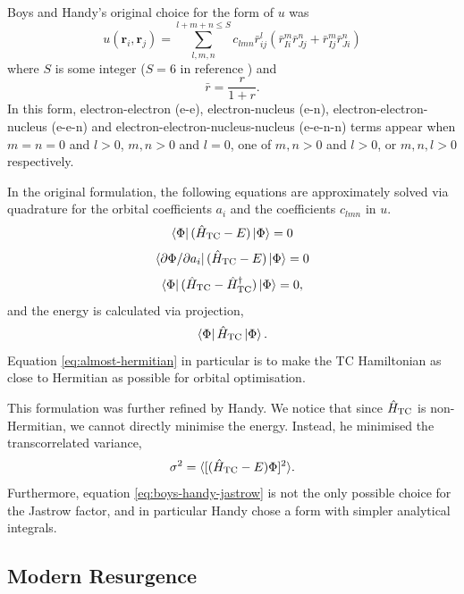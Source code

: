 Boys and Handy's original choice for the form of $u$ was
\begin{equation}
    \label{eq:boys-handy-jastrow}
    u(\bm r_i, \bm r_j) = \sum_{l,m,n}^{l+m+n\leq S} c_{lmn}\bar r_{ij}^l(\bar r_{Ii}^m\bar r_{Jj}^n + \bar r_{Ij}^m\bar r_{Ji}^n)
\end{equation}
where $S$ is some integer ($S=6$ in reference )\supercite{cohenSimilarity2019} and
\begin{equation}
    \bar r = \frac{r}{1+r}.
\end{equation}
In this form, electron-electron (e-e), electron-nucleus (e-n), electron-electron-nucleus (e-e-n) and electron-electron-nucleus-nucleus (e-e-n-n) terms appear when $m=n=0$ and $l>0$, $m,n>0$ and $l=0$, one of $m,n>0$ and $l>0$, or $m,n,l>0$ respectively.

In the original formulation,\supercite{boysCalculation1969} the following equations are approximately solved via quadrature for the orbital coefficients $a_i$ and the coefficients $c_{lmn}$ in $u$.
\begin{equation}
    \bra\Phi(\hat H_\mathrm{TC} - E)\ket\Phi = 0
\end{equation}
\begin{equation}
    \bra{\partial\Phi/\partial a_i}(\hat H_\mathrm{TC} - E)\ket\Phi = 0
\end{equation}
\begin{equation}
    \label{eq:almost-hermitian}
    \bra\Phi(\hat H_\mathrm{TC} - \hat H_\mathrm{TC}^\dag)\ket\Phi = 0,
\end{equation}
and the energy is calculated via projection,
\begin{equation}
    \bra\Phi\hat H_\mathrm{TC}\ket\Phi.
\end{equation}
Equation \ref{eq:almost-hermitian} in particular is to make the TC Hamiltonian as close to Hermitian as possible for orbital optimisation.

This formulation was further refined by Handy.\supercite{handyEnergies1969} We notice that since $\hat H_\mathrm{TC}$ is non-Hermitian, we cannot directly minimise the energy. Instead, he minimised the transcorrelated variance,
\begin{equation}
    \sigma^2 = \langle [(\hat H_\mathrm{TC} - E)\Phi]^2\rangle.
\end{equation}
Furthermore, equation \ref{eq:boys-handy-jastrow} is not the only possible choice for the Jastrow factor, and in particular Handy chose a form with simpler analytical integrals.


\subsection{Modern Resurgence}

